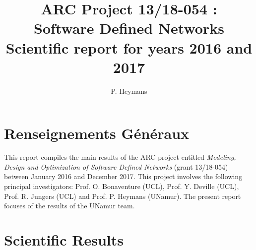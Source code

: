 \documentclass[a4paper]{article}
\title{ARC Project 13/18-054 :\\ Software Defined Networks\\
           Scientific report for years 2016 and 2017}
\author{P. Heymans}
\begin{document}
\maketitle

\section{Renseignements Généraux}

This report compiles the main results of the ARC project entitled \emph{Modeling, Design and Optimization of Software Defined Networks} (grant 13/18-054)
between January 2016 and December 2017. This project involves the
following principal investigators: Prof. O. Bonaventure (UCL), Prof. Y. Deville (UCL), Prof. R. Jungers (UCL) and Prof. P. Heymans (UNamur). The present report focuses of the results of the UNamur team. 


%

\section{Scientific Results}

%
%
\end{document}
